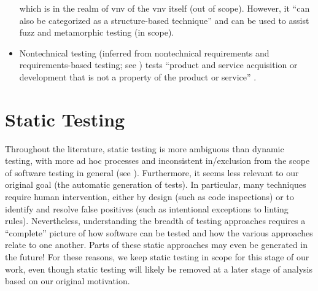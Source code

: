 \begin{itemize}
          which is in the realm of \acs{vnv} of the \acs{vnv} itself (out of
          scope). However, it ``can also be categorized as a structure-based
          technique'' and can be used to assist fuzz and metamorphic testing
          \citep[p.~5-15]{SWEBOK2024} (in scope).
          \ifnotpaper
    \item {}\label{nontech-req-test}
          Nontechnical testing (inferred from nontechnical requirements
          \citep[p.~293]{IEEE2017} and requirements-based testing; see
          ) tests ``product and service acquisition or
          development that is not a property of the product or service''
          \citep[p.~293]{IEEE2017}.
          \fi
\end{itemize}

\section{Static Testing}\label{static-test}
Throughout the literature, static testing is more ambiguous than dynamic
testing, with more ad hoc processes and inconsistent in/exclusion from the
scope of software testing in general (see ).
Furthermore, it seems less relevant to our
original goal (the automatic generation of tests). In particular, many
techniques require human intervention, either by design (such as code
inspections) or to identify and resolve false positives (such as
intentional exceptions to linting rules). Nevertheless, understanding
the breadth of testing approaches requires a ``complete'' picture of how
software can be tested and how the various approaches relate to one another.
Parts of these static approaches may even be generated in the
future! For these reasons, we keep static testing in scope for this stage
of our work, even though static testing will likely be removed at a later
stage of analysis based on our original motivation.



